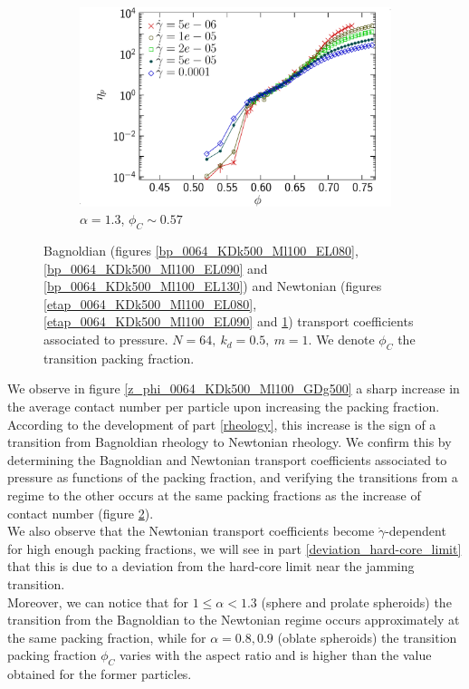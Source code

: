 \documentclass[class=report, float=false, crop=false]{standalone}
\begin{document}
\begin{figure}[h!]
\begin{subfigure}[t]{0.32\textwidth}
        \centering
        \includegraphics[width=\textwidth]{figures/figs/etap_0064_KDk500_Ml100_EL130}
        \caption{$\alpha=1.3$, $\phi_C\sim0.57$}
        \label{etap_0064_KDk500_Ml100_EL130}
    \end{subfigure}
\caption{Bagnoldian (figures \ref{bp_0064_KDk500_Ml100_EL080}, \ref{bp_0064_KDk500_Ml100_EL090} and \ref{bp_0064_KDk500_Ml100_EL130}) and Newtonian (figures \ref{etap_0064_KDk500_Ml100_EL080}, \ref{etap_0064_KDk500_Ml100_EL090} and \ref{etap_0064_KDk500_Ml100_EL130}) transport coefficients associated to pressure. $N=64,~ k_d=0.5,~ m=1$. We denote $\phi_C$ the transition packing fraction.}
\label{rheo_0064}
\end{figure}

We observe in figure \ref{z_phi_0064_KDk500_Ml100_GDg500} a sharp increase in the average contact number per particle upon increasing the packing fraction. According to the development of part \ref{rheology}, this increase is the sign of a transition from Bagnoldian rheology to Newtonian rheology. We confirm this by determining the Bagnoldian and Newtonian transport coefficients associated to pressure as functions of the packing fraction, and verifying the transitions from a regime to the other occurs at the same packing fractions as the increase of contact number (figure \ref{rheo_0064}).\\

We also observe that the Newtonian transport coefficients become $\dot{\gamma}$-dependent for high enough packing fractions, we will see in part \ref{deviation_hard-core_limit} that this is due to a deviation from the hard-core limit near the jamming transition.\\

Moreover, we can notice that for $1\le\alpha<1.3$ (sphere and prolate spheroids) the transition from the Bagnoldian to the Newtonian regime occurs approximately at the same packing fraction, while for $\alpha=0.8,0.9$ (oblate spheroids) the transition packing fraction $\phi_C$ varies with the aspect ratio and is higher than the value obtained for the former particles.
\end{document}
